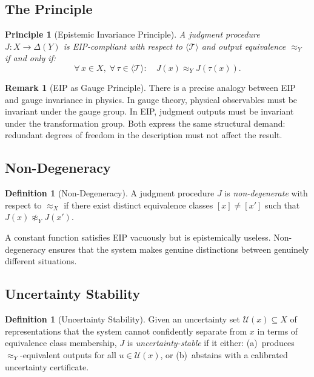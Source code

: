 \documentclass[12pt,letterpaper]{article}
\theoremstyle{definition}
\newtheorem{definition}[theorem]{Definition}
\newtheorem{remark}[theorem]{Remark}
\theoremstyle{plain}
\newtheorem{principle}[theorem]{Principle}
\newcommand{\calU}{\mathcal{U}}
\newcommand{\genT}{\langle \mathcal{T} \rangle}
\newcommand{\equivX}{\approx_X}
\newcommand{\equivY}{\approx_Y}
\begin{document}
\subsection{The Principle}

\begin{principle}[Epistemic Invariance Principle]
\label{princ:eip}
A judgment procedure $J: X \to \Delta(Y)$ is \emph{EIP-compliant} with respect to $\genT$ and output equivalence $\equivY$ if and only if:
\[
\forall\, x \in X,\; \forall\, \tau \in \genT: \quad J(x) \equivY J(\tau(x)).
\]
\end{principle}

\begin{remark}[EIP as Gauge Principle]
There is a precise analogy between EIP and gauge invariance in physics. In gauge theory, physical observables must be invariant under the gauge group. In EIP, judgment outputs must be invariant under the transformation group. Both express the same structural demand: redundant degrees of freedom in the description must not affect the result.
\end{remark}

\subsection{Non-Degeneracy}

\begin{definition}[Non-Degeneracy]
A judgment procedure $J$ is \emph{non-degenerate} with respect to $\equivX$ if there exist distinct equivalence classes $[x] \neq [x']$ such that $J(x) \not\equivY J(x')$.
\end{definition}

A constant function satisfies EIP vacuously but is epistemically useless. Non-degeneracy ensures that the system makes genuine distinctions between genuinely different situations.

\subsection{Uncertainty Stability}

\begin{definition}[Uncertainty Stability]
Given an uncertainty set $\calU(x) \subseteq X$ of representations that the system cannot confidently separate from $x$ in terms of equivalence class membership, $J$ is \emph{uncertainty-stable} if it either: (a)~produces $\equivY$-equivalent outputs for all $u \in \calU(x)$, or (b)~abstains with a calibrated uncertainty certificate.
\end{definition}
\end{document}
